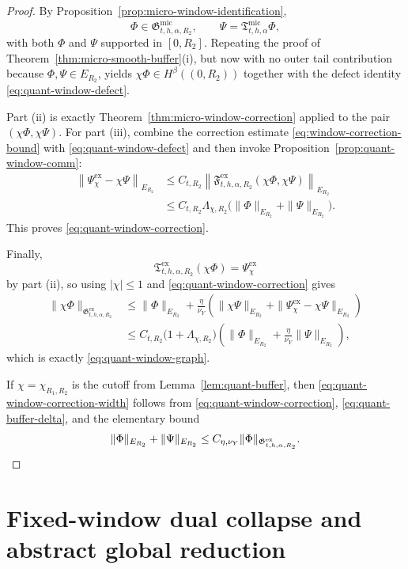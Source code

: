 \documentclass[11pt,a4paper]{amsart}
\theoremstyle{plain}
\theoremstyle{definition}
\theoremstyle{remark}
\begin{document}
\begin{proof}
By Proposition~\ref{prop:micro-window-identification},
\[
\Phi\in\mathfrak G_{t,h,\alpha,R_2}^{\mathrm{mic}},
\qquad
\Psi=\mathfrak T_{t,h,\alpha}^{\mathrm{mic}}\Phi,
\]
with both \(\Phi\) and \(\Psi\) supported in \([0,R_2]\). Repeating the proof of
Theorem~\ref{thm:micro-smooth-buffer}(i), but now with no outer tail contribution because
\(\Phi,\Psi\in E_{R_2}\), yields \(\chi\Phi\in H^\beta((0,R_2))\) together with the defect identity
\eqref{eq:quant-window-defect}.

Part (ii) is exactly Theorem~\ref{thm:micro-window-correction} applied to the pair
\((\chi\Phi,\chi\Psi)\). For part (iii), combine the correction estimate
\eqref{eq:window-correction-bound} with \eqref{eq:quant-window-defect} and then invoke
Proposition~\ref{prop:quant-window-comm}:
\begin{align*}
\left\|
\Psi_{\chi}^{\mathrm{ex}}-\chi\Psi
\right\|_{E_{R_2}}
&\le
C_{t,R_2}
\left\|
\mathfrak F_{t,h,\alpha,R_2}^{\mathrm{ex}}(\chi\Phi,\chi\Psi)
\right\|_{E_{R_2}}\\
&\le
C_{t,R_2}\Lambda_{\chi,R_2}
\bigl(
\|\Phi\|_{E_{R_2}}+\|\Psi\|_{E_{R_2}}
\bigr).
\end{align*}
This proves \eqref{eq:quant-window-correction}.

Finally,
\[
\mathfrak T_{t,h,\alpha,R_2}^{\mathrm{ex}}(\chi\Phi)=\Psi_{\chi}^{\mathrm{ex}}
\]
by part (ii), so using \(|\chi|\le1\) and \eqref{eq:quant-window-correction} gives
\begin{align*}
\|\chi\Phi\|_{\mathfrak G_{t,h,\alpha,R_2}^{\mathrm{ex}}}
&\le
\|\Phi\|_{E_{R_2}}
+
\frac{\eta}{\nu_Y}
\left(
\|\chi\Psi\|_{E_{R_2}}
+
\|\Psi_{\chi}^{\mathrm{ex}}-\chi\Psi\|_{E_{R_2}}
\right)\\
&\le
C_{t,R_2}
\bigl(1+\Lambda_{\chi,R_2}\bigr)
\left(
\|\Phi\|_{E_{R_2}}
+
\frac{\eta}{\nu_Y}\|\Psi\|_{E_{R_2}}
\right),
\end{align*}
which is exactly \eqref{eq:quant-window-graph}.

If \(\chi=\chi_{R_1,R_2}\) is the cutoff from Lemma~\ref{lem:quant-buffer}, then
\eqref{eq:quant-window-correction-width} follows from
\eqref{eq:quant-window-correction}, \eqref{eq:quant-buffer-delta}, and the elementary bound
\[
\|\Phi\|_{E_{R_2}}+\|\Psi\|_{E_{R_2}}
\le
C_{\eta,\nu_Y}
\|\Phi\|_{\mathfrak G_{t,h,\alpha,R_2}^{\mathrm{ex}}}.
\qedhere
\]
\end{proof}

\section{Fixed-window dual collapse and abstract global reduction}
\label{sec:micro-dual}
\end{document}
